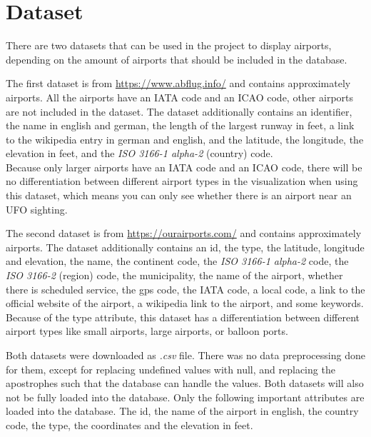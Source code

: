 \documentclass{article}
\begin{document}
\section*{Dataset}
There are two datasets that can be used in the project to display airports, depending on the amount of airports that should be included in the database.
\begin{compactenum}[1.]
\item The first dataset is from \url{https://www.abflug.info/} and contains approximately  airports. All the airports have an IATA code and an ICAO code, other airports are not included in the dataset. The dataset additionally contains an identifier, the name in english and german, the length of the largest runway in feet, a link to the wikipedia entry in german and english, and the latitude, the longitude, the elevation in feet, and the \textit{ISO 3166-1 alpha-2} (country) code.\\
Because only larger airports have an IATA code and an ICAO code, there will be no differentiation between different airport types in the visualization when using this dataset, which means you can only see whether there is an airport near an UFO sighting.
\item The second dataset is from \url{https://ourairports.com/} and contains approximately  airports. The dataset additionally contains an id, the type, the latitude, longitude and elevation, the name, the continent code, the \textit{ISO 3166-1 alpha-2} code, the \textit{ISO 3166-2} (region) code, the municipality, the name of the airport, whether there is scheduled service, the gps code, the IATA code, a local code, a link to the official website of the airport, a wikipedia link to the airport, and some keywords.\\
Because of the type attribute, this dataset has a differentiation between different airport types like small airports, large airports, or balloon ports.
\end{compactenum}
Both datasets were downloaded as \textit{.csv} file. There was no data preprocessing done for them, except for replacing undefined values with null, and replacing the apostrophes such that the database can handle the values. Both datasets will also not be fully loaded into the database. Only the following important attributes are loaded into the database. The id, the name of the airport in english, the country code, the type, the coordinates and the elevation in feet.\\
\end{document}
